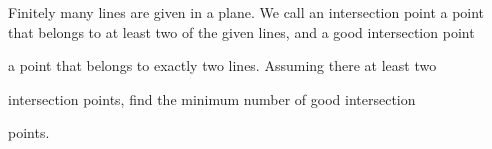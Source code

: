 Finitely many lines are given in a plane. We call an intersection point a point that belongs to at least two of the given lines, and a good intersection point

 a point that belongs to exactly two lines. Assuming there at least two 

intersection points, find the minimum number of good intersection 

points.